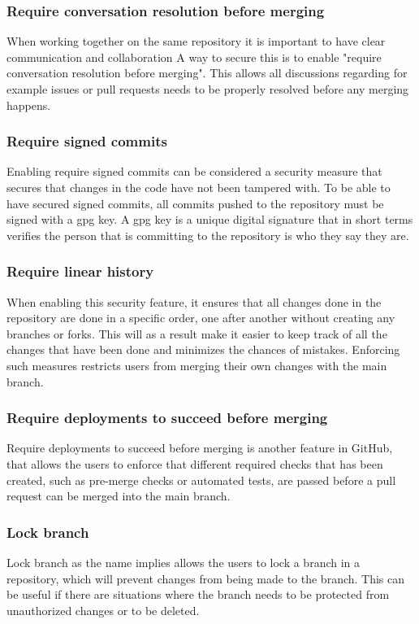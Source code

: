 \subsubsection{Require conversation resolution before merging}
When working together on the same repository it is important to have  clear communication and collaboration  A way to secure this is to enable "require conversation resolution before merging". This allows all discussions regarding for example issues or pull requests needs to be properly resolved before any merging happens. 
\\
\subsubsection{Require signed commits}
Enabling require signed commits can be considered a security measure that secures that changes in the code have not been tampered with. 
To be able to have secured signed commits, all commits pushed to the repository must be signed with a \acrlong{gpg} key. A \acrshort{gpg} key is  a unique digital signature that in short terms verifies the person that is committing to the repository is who they say they are. 


\subsubsection{Require linear history}
When enabling this security feature, it ensures that all changes done in the repository are done in a specific order, one after another without creating any branches or forks. This will as a result make it easier to keep track of all the changes that have been done and minimizes the chances of mistakes. Enforcing such measures restricts users from merging their own changes with the main branch. 

\subsubsection{Require deployments to succeed before merging}
Require deployments to succeed before merging is another feature in GitHub, that allows the users to enforce that different required checks that has been created, such as pre-merge checks or automated tests, are passed before a pull request can be merged into the main branch.



\subsubsection{Lock branch}
Lock branch as the name implies allows the users to lock a branch in a repository, which will prevent changes from being made to the branch. This can be useful if there are situations where the branch needs to be protected from unauthorized changes or to be deleted. 
\newpage

